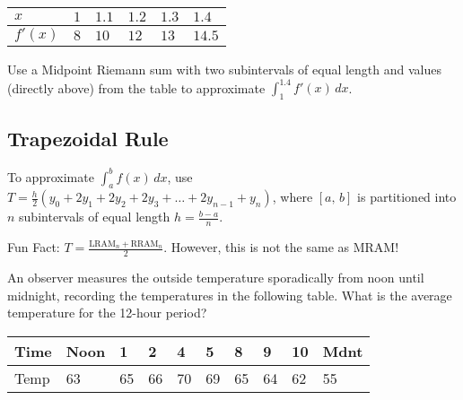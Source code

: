 \documentclass[addpoints, 12pt]{exam}
\newcommand\Tstrut{\rule{0pt}{2.6ex}}         %
\newcommand\Bstrut{\rule[-0.9ex]{0pt}{0pt}}   %
\begin{document}
\begin{questions}
    \begin{longtable}[ht]{|C{1cm}|C{1cm}|C{1cm}|C{1cm}|C{1cm}|C{1cm}|}
        \hline
        $x$\Tstrut\Bstrut & $1$\Tstrut\Bstrut & $1.1$\Tstrut\Bstrut & $1.2$\Tstrut\Bstrut & $1.3$\Tstrut\Bstrut & $1.4$\Tstrut\Bstrut \\\hline
        $f'(x)$\Tstrut\Bstrut & $8$\Tstrut\Bstrut & $10$\Tstrut\Bstrut & $12$\Tstrut\Bstrut & $13$\Tstrut\Bstrut & $14.5$\Tstrut\Bstrut \\\hline
    \end{longtable}
    
    
    \question Use a Midpoint Riemann sum with two subintervals of equal length and values (directly above) from the table to approximate $\displaystyle\int_1^{1.4} f'(x)\,dx$.
    
    
    
\end{questions}


\newpage



\subsection*{Trapezoidal Rule}
\begin{tcolorbox}[title= THE TRAPEZOIDAL RULE, colframe=black,sharp corners,colback=white,colbacktitle=white,coltitle=black,boxrule=1pt]

    To approximate $\displaystyle\int_a^b f(x)\,dx$, use $\displaystyle T=\frac{h}{2}\left(y_0+2y_1+2y_2+2y_3+\dots+2y_{n-1}+y_n\right)$,
    where $[a,\,b]$ is partitioned into $n$ subintervals of equal length $\displaystyle h=\frac{b-a}{n}$.
    
\end{tcolorbox}

Fun Fact: $\displaystyle T=\frac{\text{LRAM}_n+\text{RRAM}_n}{2}$. However, this is not the same as MRAM!\\
\begin{questions}
    \question An observer measures the outside temperature sporadically from noon until midnight, recording the temperatures in the following table. What is the average temperature for the 12-hour period?
    
    \begin{longtable}{|C{.9cm}|C{.9cm}|C{.5cm}|C{.5cm}|C{.5cm}|C{.5cm}|C{.5cm}|C{.5cm}|C{.5cm}|C{1.4cm}|}
        \hline
        Time \Tstrut\Bstrut & Noon \Tstrut\Bstrut & 1 \Tstrut\Bstrut & 2 \Tstrut\Bstrut & 4 \Tstrut\Bstrut & 5 \Tstrut\Bstrut & 8 \Tstrut\Bstrut & 9 \Tstrut\Bstrut & 10\Tstrut\Bstrut & Mdnt \Tstrut\Bstrut \\\hline
        Temp \Tstrut\Bstrut & 63\Tstrut\Bstrut & 65\Tstrut\Bstrut & 66\Tstrut\Bstrut & 70\Tstrut\Bstrut & 69\Tstrut\Bstrut & 65\Tstrut\Bstrut & 64\Tstrut\Bstrut & 62\Tstrut\Bstrut & 55\Tstrut\Bstrut \\\hline
    \end{longtable}  
    
    
\end{questions}
\end{document}
